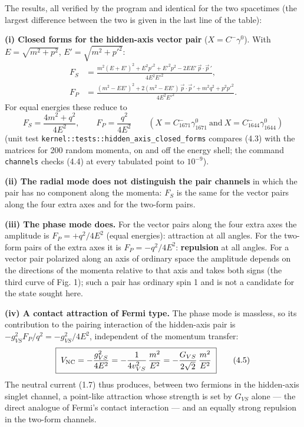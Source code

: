 \documentclass[
  10pt,
]{article}
\begin{document}
The results, all verified by the program and identical for the two
spacetimes (the largest difference between the two is given in the last
line of the table):

\textbf{(i) Closed forms for the hidden-axis vector pair}
(\(X=C^{-}\gamma^0\)). With \(E=\sqrt{m^2+p^2}\),
\(E'=\sqrt{m^2+p'^2}\):
\[\begin{aligned}F_S&=\frac{m^2(E+E')^2+E^2p'^2+E'^2p^2-2EE'\,\vec p\cdot\vec p\,'}{4E^2E'^2},\\
F_P&=\frac{(m^2-EE')^2+2(m^2-EE')\,\vec p\cdot\vec p\,'+m^2q^2+p^2p'^2}{4E^2E'^2}.\end{aligned}\tag{4.3}\]
For equal energies these reduce to
\[\boxed{\;F_S=\frac{4m^2+q^2}{4E^2},\qquad F_P=\frac{q^2}{4E^2}\qquad(X=C_{1671}^{-}\gamma_{1671}^0\ \text{and}\ X=C_{1644}^{-}\gamma_{1644}^0)\;}\tag{4.4}\]
(unit test \texttt{kernel::tests::hidden\_axis\_closed\_forms} compares
(4.3) with the matrices for 200 random momenta, on and off the energy
shell; the command \texttt{channels} checks (4.4) at every tabulated
point to \(10^{-9}\)).

\textbf{(ii) The radial mode does not distinguish the pair channels} in
which the pair has no component along the momenta: \(F_S\) is the same
for the vector pairs along the four extra axes and for the two-form
pairs.

\textbf{(iii) The phase mode does.} For the vector pairs along the four
extra axes the amplitude is \(F_P=+q^2/4E^2\) (equal energies):
attraction at all angles. For the two-form pairs of the extra axes it is
\(F_P=-q^2/4E^2\): \textbf{repulsion} at all angles. For a vector pair
polarized along an axis of ordinary space the amplitude depends on the
directions of the momenta relative to that axis and takes both signs
(the third curve of Fig. 1); such a pair has ordinary spin 1 and is not
a candidate for the state sought here.

\textbf{(iv) A contact attraction of Fermi type.} The phase mode is
massless, so its contribution to the pairing interaction of the
hidden-axis pair is \(-g_{VS}^2F_P/q^2=-g_{VS}^2/4E^2\), independent of
the momentum transfer:
\[\boxed{\;V_{\rm NC}=-\frac{g_{VS}^2}{4E^2}=-\frac{1}{4v_{VS}^2}\,\frac{m^2}{E^2}=-\frac{G_{VS}}{2\sqrt2}\,\frac{m^2}{E^2}\;}\tag{4.5}\]
The neutral current (1.7) thus produces, between two fermions in the
hidden-axis singlet channel, a point-like attraction whose strength is
set by \(G_{VS}\) alone --- the direct analogue of Fermi's contact
interaction --- and an equally strong repulsion in the two-form
channels.
\end{document}
